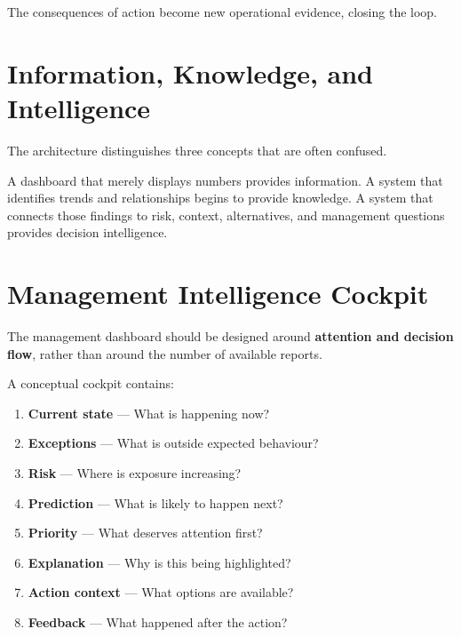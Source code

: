 \documentclass[11pt,a4paper]{article}
\begin{document}
The consequences of action become new operational evidence, closing the loop.

\section{Information, Knowledge, and Intelligence}

The architecture distinguishes three concepts that are often confused.

\begin{center}
\end{center}

A dashboard that merely displays numbers provides information. A system that
identifies trends and relationships begins to provide knowledge. A system that
connects those findings to risk, context, alternatives, and management
questions provides decision intelligence.

\section{Management Intelligence Cockpit}

The management dashboard should be designed around \textbf{attention and
decision flow}, rather than around the number of available reports.

A conceptual cockpit contains:

\begin{enumerate}
\item \textbf{Current state} --- What is happening now?
\item \textbf{Exceptions} --- What is outside expected behaviour?
\item \textbf{Risk} --- Where is exposure increasing?
\item \textbf{Prediction} --- What is likely to happen next?
\item \textbf{Priority} --- What deserves attention first?
\item \textbf{Explanation} --- Why is this being highlighted?
\item \textbf{Action context} --- What options are available?
\item \textbf{Feedback} --- What happened after the action?
\end{enumerate}
\end{document}
